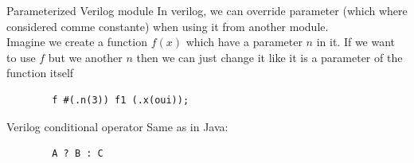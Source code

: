 \begin{parag}{Parameterized Verilog module}
    In verilog, we can override parameter (which where considered comme constante) when using it from another module.\\
    Imagine we create a function $f\left(x\right)$ which have a parameter $n$ in it. If we want to use $f$ but we another $n$ then we can just change it like it is a parameter of the function itself
    \begin{lstlisting}
        f #(.n(3)) f1 (.x(oui));
    \end{lstlisting}

    
\end{parag}



\begin{parag}{Verilog conditional operator}
    Same as in Java:
    \begin{lstlisting}
        A ? B : C
    \end{lstlisting}
    
\end{parag}

